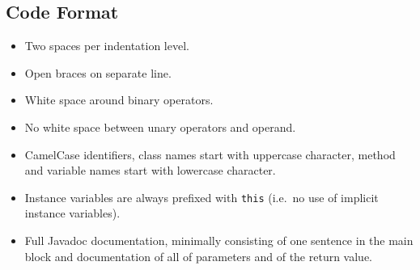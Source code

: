 \documentclass[a4paper,fleqn]{article}
\newcommand{\computercode}[1]{\texttt{#1}}
\begin{document}
\subsection{Code Format}

\begin{itemize}

\item Two spaces per indentation level.

\item Open braces on separate line.

\item White space around binary operators.

\item No white space between unary operators and operand.

\item CamelCase identifiers, class names start with uppercase
  character, method and variable names start with lowercase character.

\item Instance variables are always prefixed with \computercode{this}
  (i.e.\ no use of implicit instance variables).

\item Full Javadoc documentation, minimally consisting of one sentence
  in the main block and documentation of all of parameters and of the
  return value.

\end{itemize}
\end{document}

